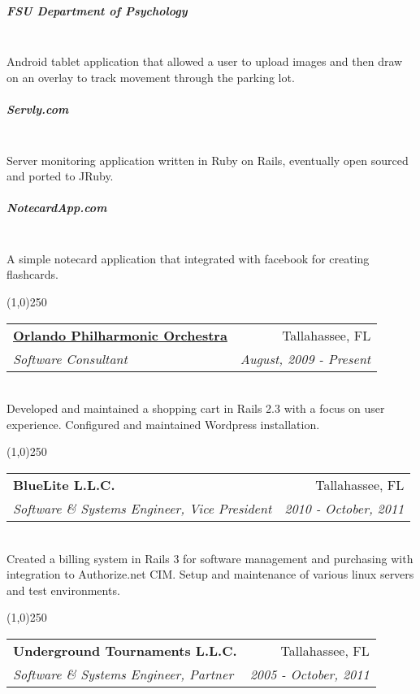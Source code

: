 \documentclass[letterpaper,11pt]{article}
\makeatletter
\newcommand{\ressubheading}[4]{
\begin{tabular*}{7.0in}{l@{\extracolsep{\fill}}r}
		\textbf{#1} & #2 \\
		\textit{#3} & \textit{#4} \\
\end{tabular*}\vspace{-6pt}}
\makeatother
\begin{document}
\subparagraph{FSU Department of Psychology} \hspace{5pt} \\

Android tablet application that allowed a user to upload images and then draw on an overlay to track movement through the parking lot.

\subparagraph{Servly.com} \hspace{5pt} \\

Server monitoring application written in Ruby on Rails, eventually open sourced and ported to JRuby.

\subparagraph{NotecardApp.com} \hspace{5pt} \\

A simple notecard application that integrated with facebook for creating flashcards.

\setlength{\parindent}{0pt}

\begin{center}
  \line(1,0){250}
\end{center}


\ressubheading{\href{http://orlandophil.org/}{Orlando Philharmonic Orchestra}}{Tallahassee, FL}{Software Consultant}{August, 2009 - Present}

\hspace{5pt} \\

Developed and maintained a shopping cart in Rails 2.3 with a focus on user experience. Configured and maintained Wordpress installation.


\begin{center}
  \line(1,0){250}
\end{center}


\ressubheading{BlueLite L.L.C.}{Tallahassee, FL}{Software \& Systems Engineer, Vice President}{2010 - October, 2011}

\hspace{5pt} \\

Created a billing system in Rails 3 for software management and purchasing with integration to Authorize.net CIM.
Setup and maintenance of various linux servers and test environments.


\begin{center}
  \line(1,0){250}
\end{center}

\ressubheading{Underground Tournaments L.L.C.}{Tallahassee, FL}{Software \& Systems Engineer, Partner}{2005 - October, 2011}
\end{document}
